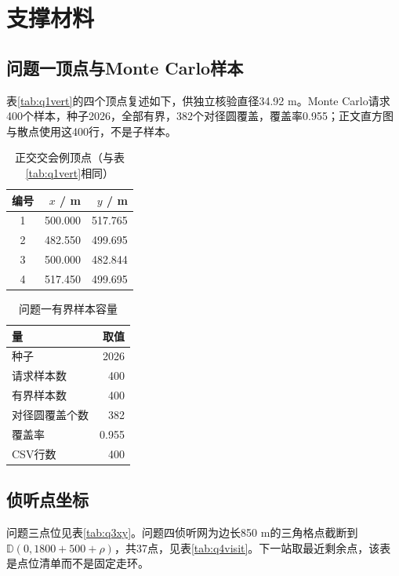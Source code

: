 \documentclass{cumcmthesis}
\begin{document}
\appendix
\section{支撑材料}

\subsection{问题一顶点与Monte Carlo样本}

表\ref{tab:q1vert}的四个顶点复述如下，供独立核验直径34.92 m。Monte Carlo请求400个样本，种子2026，全部有界，382个对径圆覆盖，覆盖率0.955；正文直方图与散点使用这400行，不是子样本。

\begin{table}[htbp]
\centering
\caption{正交交会例顶点（与表\ref{tab:q1vert}相同）}
\label{tab:q1vertapp}
\begin{tabular}{crr}
\toprule
编号 & $x$ / m & $y$ / m \\
\midrule
1 & 500.000 & 517.765 \\
2 & 482.550 & 499.695 \\
3 & 500.000 & 482.844 \\
4 & 517.450 & 499.695 \\
\bottomrule
\end{tabular}
\end{table}

\begin{table}[htbp]
\centering
\caption{问题一有界样本容量}
\label{tab:q1mcmeta}
\begin{tabular}{lr}
\toprule
量 & 取值 \\
\midrule
种子 & 2026 \\
请求样本数 & 400 \\
有界样本数 & 400 \\
对径圆覆盖个数 & 382 \\
覆盖率 & 0.955 \\
CSV行数 & 400 \\
\bottomrule
\end{tabular}
\end{table}


\subsection{侦听点坐标}

问题三点位见表\ref{tab:q3xy}。问题四侦听网为边长850 m的三角格点截断到$\mathbb{D}(0,1800+500+\rho)$，共37点，见表\ref{tab:q4visit}。下一站取最近剩余点，该表是点位清单而不是固定走环。
\end{document}
